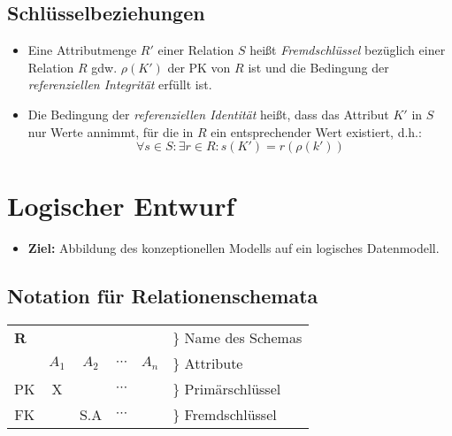         \subsection{Schlüsselbeziehungen} %
            \begin{itemize}
            	\item Eine Attributmenge \(R'\) einer Relation \(S\) heißt \textit{Fremdschlüssel} bezüglich einer Relation \(R\) gdw. \( \rho(K') \) der PK von \(R\) ist und die Bedingung der \textit{referenziellen Integrität} erfüllt ist.
            	\item Die Bedingung der \textit{referenziellen Identität} heißt, dass das Attribut \(K'\) in \(S\) nur Werte annimmt, für die in \(R\) ein entsprechender Wert existiert, d.h.:
            		\begin{equation*}
                		\forall s \in S : \exists r \in R : s(K') = r(\rho(k'))
            		\end{equation*}
            \end{itemize}

    \section{Logischer Entwurf} %
        \begin{itemize}
        	\item \textbf{Ziel:} Abbildung des konzeptionellen Modells auf ein logisches Datenmodell.
        \end{itemize}

        \subsection{Notation für Relationenschemata} %
        	\begin{table}[H]
        		\centering
        		\begin{tabular}{| c | c | c | c | c | l}
        			\multicolumn{5}{l}{\textbf{R}}                  & \( \} \) Name des Schemas \\ \cline{1-5}
        			   & \(A_1\) & \(A_2\) & \(\cdots\) & \(A _ n\) & \( \} \) Attribute        \\ \cline{1-5}
        			PK & X       &         & \(\cdots\) &           & \( \} \) Primärschlüssel  \\ \cline{1-5}
        			FK &         & S.A     & \(\cdots\) &           & \( \} \) Fremdschlüssel   \\ \cline{1-5}
        		\end{tabular}
        	\end{table}

